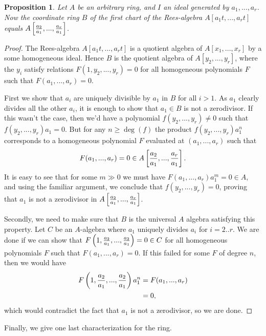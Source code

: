 \documentclass[12pt,a4paper,leqno]{article}
\theoremstyle{plain}
\newtheorem{prop}[theo]{Proposition}
\theoremstyle{definition}
\theoremstyle{remark}
\begin{document}
\begin{prop}
Let $A$ be an arbitrary ring, and $I$ an ideal generated by $a_1,...,a_r$. Now the coordinate ring $B$ of the first chart of the Rees-algebra $A[a_1 t,...,a_r t]$ equals $A \left[ {a_2 \over a_1},...,{a_r \over a_1} \right]$.
\end{prop}
\begin{proof}
The Rees-algebra $A[a_1 t,...,a_r t]$ is a quotient algebra of $A[x_1,...,x_r]$ by a some homogeneous ideal. Hence $B$ is the quotient algebra of $A[y_2,...,y_r]$, where the $y_i$ satisfy relations $F(1,y_2,...,y_r) = 0$ for all homogeneous polynomials $F$ such that $F(a_1,...,a_r) = 0$. 

First we show that $a_i$ are uniquely divisible by $a_1$ in $B$ for all $i>1$. As $a_1$ clearly divides all the other $a_i$, it is enough to show that $a_1 \in B$ is not a zerodivisor. If this wasn't the case, then we'd have a polynomial $f(y_2,...,y_r) \not = 0$ such that $f(y_2,...,y_r) a_1 = 0$. But for any $n \geq \deg (f)$ the product $f(y_2,...,y_r) a_1^n$ corresponds to a homogeneous polynomial $F$ evaluated at $(a_1,...,a_r)$ such that
\begin{equation*}
F(a_1,...,a_r) = 0 \in A \left[ {a_2 \over a_1},...,{a_r \over a_1} \right].
\end{equation*} 
It is easy to see that for some $m \gg 0$ we must have $F(a_1,...,a_r)a_1^m = 0 \in A$, and using the familiar argument, we conclude that $f(y_2,...,y_r) = 0$, proving that $a_1$ is not a zerodivisor in $ A \left[ {a_2 \over a_1},...,{a_r \over a_1} \right]$.

Secondly, we need to make sure that $B$ is the universal $A$ algebra satisfying this property. Let $C$ be an $A$-algebra where $a_1$ uniquely divides $a_i$ for $i=2..r$. We are done if we can show that $F \left( 1, {a_2 \over a_1},...,{a_2 \over a_1} \right) = 0 \in C$ for all homogeneous polynomials $F$ such that $F(a_1, ... ,a_r) = 0$. If this failed for some $F$ of degree $n$, then we would have
\begin{align*}
F \left( 1, {a_2 \over a_1},...,{a_2 \over a_1} \right) a_1^n &= F(a_1,...,a_r) \\
&= 0,
\end{align*}
which would contradict the fact that $a_1$ is not a zerodivisor, so we are done.
\end{proof}

Finally, we give one last characterization for the ring.
\end{document}
